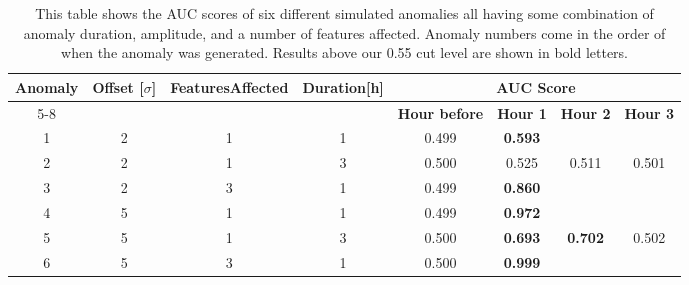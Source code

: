 \documentclass[5p]{elsarticle}
\begin{document}
\begin{table}[htbp]
\centering
\caption{This table shows the AUC scores of six different simulated anomalies all having some combination of anomaly duration, amplitude, and a number of features affected. Anomaly numbers come in the order of when the anomaly was generated. Results above our 0.55 cut level are shown in bold letters.}
\label{table:bdtonfixed}
\resizebox{\linewidth}{!} {%
\begin{tabular}{@{}cccccccc@{}}
\toprule
\multirow{2}{*}{\textbf{Anomaly}} & \multirow{2}{*}{\textbf{Offset {[}$\sigma${]}}} & \multirow{2}{*}{\textbf{Features\newline Affected}} & \multirow{2}{*}{\textbf{Duration{[}h{]}}} & \multicolumn{4}{c}{\textbf{AUC Score}}                                     \\ \cmidrule(l){5-8} 
                                  &                                                 &                                             &                                           & \textbf{Hour before} & \textbf{Hour 1} & \textbf{Hour 2} & \textbf{Hour 3} \\ \midrule
1                                 & 2                                               & 1                                           & 1                                         & 0.499                & \textbf{0.593}  &                 &                 \\
2                                 & 2                                               & 1                                           & 3                                         & 0.500                & 0.525  & 0.511  & 0.501           \\
3                                 & 2                                               & 3                                           & 1                                         & 0.499                & \textbf{0.860}  &                 &                 \\
4                                 & 5                                               & 1                                           & 1                                         & 0.499                & \textbf{0.972}  &                 &                 \\
5                                 & 5                                               & 1                                           & 3                                         & 0.500                & \textbf{0.693}  & \textbf{0.702}  & 0.502           \\
6                                 & 5                                               & 3                                           & 1                                         & 0.500                & \textbf{0.999}  &                 &                 \\ 
\bottomrule
\end{tabular}%
}
\end{table}
\end{document}
